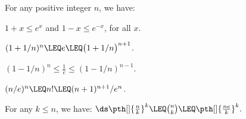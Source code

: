 \begin {lemma} For any positive integer $n$, we have: \begin {compactenumi} \medskip \item $1+x \leq e^x$ \;\;and\;\; $1-x \leq e^{-x}$, for all $x$. \par \medskip \item $(1+1/n)^n \LEQ e \LEQ \bigl (1+1/n\bigr )^{n+1}$. \par \medskip \item $(1-1/n)^n \leq \frac {1}{e} \leq (1-1/n)^{n-1} $. \par \medskip \item $(n/e)^n \LEQ n! \LEQ (n+1)^{n+1} / e^n$. \par \item For any $k \leq n$, we have: \begin {math} \ds \pth []{\frac {n}{k}}^k \LEQ \binom {n}{k}\LEQ \pth []{\frac {n e}{k}}^k. \end {math} \end {compactenumi} \end {lemma}

